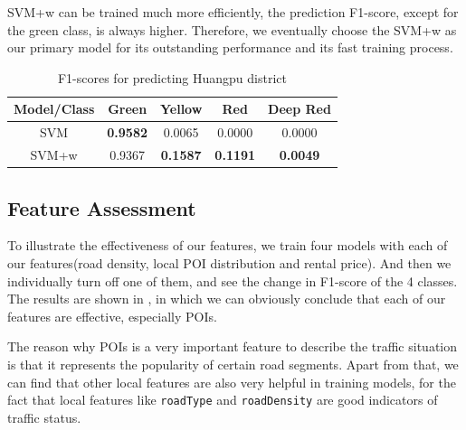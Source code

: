 
SVM+w can be trained much more efficiently, the prediction
F1-score, except for the green class, is always higher. 
Therefore, we eventually choose the SVM+w as our primary model 
for its outstanding performance and 
its fast training process. 

\begin{table}[ht]
\small
\centering
\caption{F1-scores for predicting Huangpu district}
\label{tab:modelselect}
\begin{tabular}{|c|c|c|c|c|} \hline
Model/Class & Green & Yellow & Red & Deep Red \\ \hline
SVM & {\bf 0.9582} & 0.0065& 0.0000 & 0.0000 \\ \hline
SVM+w & 0.9367 & \bf 0.1587  & {\bf 0.1191}  & {\bf 0.0049} \\ \hline 
\end{tabular}
\end{table}

\subsection{Feature Assessment}
To illustrate the effectiveness of our features, we train four models with each of our features(road density, local POI distribution and rental price). And then we individually turn off one of them, and see the change in F1-score of the 4 classes. The results are shown in , in which we can obviously conclude that each of our features are effective, especially POIs. 


The reason why POIs is a very important feature to describe the traffic situation is that it represents the popularity of certain road segments. Apart from that, we can find that other local features are also very helpful in training models, for the fact that local features like \texttt{roadType} and \texttt{roadDensity} are good indicators of traffic status.


